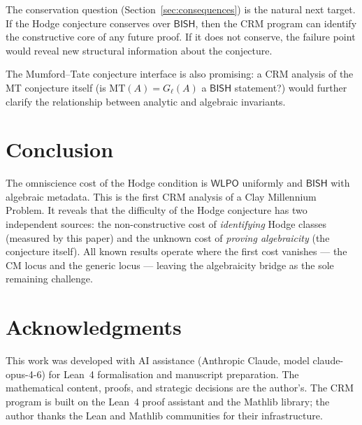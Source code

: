 \documentclass[11pt]{article}
\theoremstyle{plain}
\theoremstyle{definition}
\theoremstyle{remark}
\newcommand{\MT}{\mathrm{MT}}
\newcommand{\BISH}{\ensuremath{\mathsf{BISH}}}
\newcommand{\WLPO}{\ensuremath{\mathsf{WLPO}}}
\begin{document}
The conservation question (Section~\ref{sec:consequences}) is the natural next target. If the Hodge conjecture conserves over $\BISH$, then the CRM program can identify the constructive core of any future proof. If it does not conserve, the failure point would reveal new structural information about the conjecture.

The Mumford--Tate conjecture interface is also promising: a CRM analysis of the MT conjecture itself (is $\MT(A) = G_\ell(A)$ a $\BISH$ statement?) would further clarify the relationship between analytic and algebraic invariants.


\section{Conclusion}\label{sec:conclusion}

The omniscience cost of the Hodge condition is $\WLPO$ uniformly and $\BISH$ with algebraic metadata. This is the first CRM analysis of a Clay Millennium Problem. It reveals that the difficulty of the Hodge conjecture has two independent sources: the non-constructive cost of \emph{identifying} Hodge classes (measured by this paper) and the unknown cost of \emph{proving algebraicity} (the conjecture itself). All known results operate where the first cost vanishes --- the CM locus and the generic locus --- leaving the algebraicity bridge as the sole remaining challenge.


\section*{Acknowledgments}

This work was developed with AI assistance (Anthropic Claude, model claude-opus-4-6) for Lean~4 formalisation and manuscript preparation. The mathematical content, proofs, and strategic decisions are the author's. The CRM program is built on the Lean~4 proof assistant and the Mathlib library; the author thanks the Lean and Mathlib communities for their infrastructure.
\end{document}
